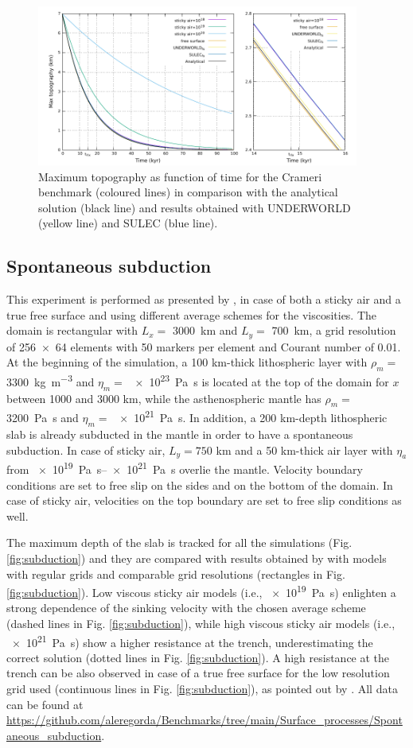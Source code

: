 \documentclass[hidelinks,10pt,a4paper]{article}
\begin{document}
\begin{figure}
\centering
\noindent\includegraphics[width=400px]{./Figures/Crameri.pdf}
\caption{Maximum topography as function of time for the Crameri benchmark (coloured lines) in comparison with the analytical solution (black line) and results
obtained with UNDERWORLD (yellow line) and SULEC (blue line).}
\label{fig:crameri}
\end{figure}

\subsection{Spontaneous subduction}\label{sec:subduction}
This experiment is performed as presented by \citet{Schmeling2008}, in case of both a sticky air and a true free surface and using different average schemes
for the viscosities. The domain is rectangular with $L_x=$ \SI{3000}{\km} and $L_y=$ \SI{700}{\km}, a grid resolution of \num{256x64} elements with 50 markers
per element and Courant number of 0.01. At the beginning of the simulation, a 100 km-thick lithospheric layer with $\rho_m=$ \SI{3300}{\kg\per\cubic\metre}
and $\eta_m=$ \SI{e23}{\pascal\s} is located at the top of the domain for $x$ between 1000 and 3000 km, while the asthenospheric mantle has $\rho_m=$
\SI{3200}{\pascal\s} and $\eta_m=$ \SI{e21}{\pascal\s}. In addition, a 200 km-depth lithospheric slab is already subducted in the mantle in order to have
a spontaneous subduction. In case of sticky air, $L_y=750$ km and a 50 km-thick air layer with $\eta_a$ from \SIrange{e19}{e21}{\pascal\s} overlie the mantle.
Velocity boundary conditions are set to free slip on the sides and on the bottom of the domain. In case of sticky air, velocities on the top boundary are set
to free slip conditions as well.

The maximum depth of the slab is tracked for all the simulations (Fig. \ref{fig:subduction}) and they are compared with results obtained by
\citet{Schmeling2008} with models with regular grids and comparable grid resolutions (rectangles in Fig. \ref{fig:subduction}). Low viscous sticky air models
(i.e., \SI{e19}{\pascal\s}) enlighten a strong dependence of the sinking velocity with the chosen average scheme (dashed lines in Fig. \ref{fig:subduction}),
while high viscous sticky air models (i.e., \SI{e21}{\pascal\s}) show a higher resistance at the trench, underestimating the correct solution (dotted lines in
Fig. \ref{fig:subduction}). A high resistance at the trench can be also observed in case of a true free surface for the low resolution grid used (continuous
lines in Fig. \ref{fig:subduction}), as pointed out by \citet{Schmeling2008}. All data can be 
found at \url{https://github.com/aleregorda/Benchmarks/tree/main/Surface_processes/Spontaneous_subduction}.
\end{document}
